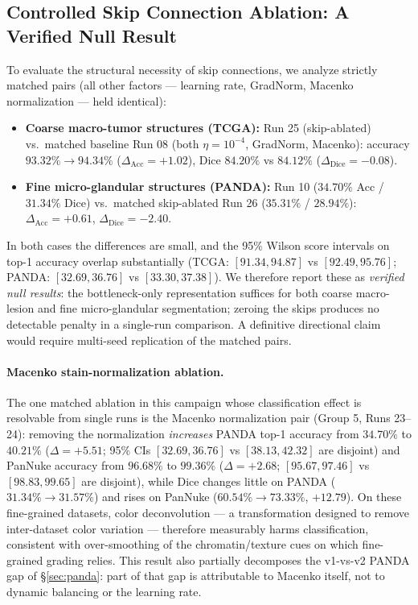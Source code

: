 \documentclass[runningheads]{llncs}
\begin{document}
\subsection{Controlled Skip Connection Ablation: A Verified Null Result}\label{sec:skip}
To evaluate the structural necessity of skip connections, we analyze strictly matched pairs (all other factors --- learning rate, GradNorm, Macenko normalization --- held identical):
\begin{itemize}
    \item \textbf{Coarse macro-tumor structures (TCGA):} Run 25 (skip-ablated) vs.\ matched baseline Run 08 (both $\eta=10^{-4}$, GradNorm, Macenko): accuracy $93.32\% \to 94.34\%$ ($\Delta_{\text{Acc}} = +1.02$), Dice $84.20\%$ vs $84.12\%$ ($\Delta_{\text{Dice}} = -0.08$).
    \item \textbf{Fine micro-glandular structures (PANDA):} Run 10 ($34.70\%$ Acc / $31.34\%$ Dice) vs.\ matched skip-ablated Run 26 ($35.31\%$ / $28.94\%$): $\Delta_{\text{Acc}} = +0.61$, $\Delta_{\text{Dice}} = -2.40$.
\end{itemize}
In both cases the differences are small, and the 95\% Wilson score intervals on top-1 accuracy overlap substantially (TCGA: $[91.34, 94.87]$ vs $[92.49, 95.76]$; PANDA: $[32.69, 36.76]$ vs $[33.30, 37.38]$). We therefore report these as \emph{verified null results}: the bottleneck-only representation suffices for both coarse macro-lesion and fine micro-glandular segmentation; zeroing the skips produces no detectable penalty in a single-run comparison. A definitive directional claim would require multi-seed replication of the matched pairs.

\paragraph{Macenko stain-normalization ablation.}
The one matched ablation in this campaign whose classification effect is resolvable from single runs is the Macenko normalization pair (Group 5, Runs 23--24): removing the normalization \emph{increases} PANDA top-1 accuracy from $34.70\%$ to $40.21\%$ ($\Delta = +5.51$; 95\% CIs $[32.69, 36.76]$ vs $[38.13, 42.32]$ are disjoint) and PanNuke accuracy from $96.68\%$ to $99.36\%$ ($\Delta = +2.68$; $[95.67, 97.46]$ vs $[98.83, 99.65]$ are disjoint), while Dice changes little on PANDA ($31.34\% \to 31.57\%$) and rises on PanNuke ($60.54\% \to 73.33\%$, $+12.79$). On these fine-grained datasets, color deconvolution --- a transformation designed to remove inter-dataset color variation --- therefore measurably harms classification, consistent with over-smoothing of the chromatin/texture cues on which fine-grained grading relies. This result also partially decomposes the v1-vs-v2 PANDA gap of \S\ref{sec:panda}: part of that gap is attributable to Macenko itself, not to dynamic balancing or the learning rate.
\end{document}
